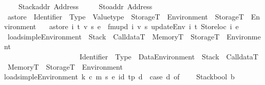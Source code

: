 \begin{isabellebody}
\ \ \ \ Stackaddr\ Address\ {\isacharbar}{\kern0pt}\isanewline
\ \ \ \ Stoaddr\ Address\isanewline
\isanewline
{}\isamarkupfalse%
\ astore\ {\isacharcolon}{\kern0pt}{\isacharcolon}{\kern0pt}\ {\isachardoublequoteopen}Identifier\ {\isasymRightarrow}\ Type\ {\isasymRightarrow}\ Valuetype\ {\isasymRightarrow}\ StorageT\ {\isacharasterisk}{\kern0pt}\ Environment\ {\isasymRightarrow}\ StorageT\ {\isacharasterisk}{\kern0pt}\ Environment{\isachardoublequoteclose}\isanewline
\ \ \ {\isachardoublequoteopen}astore\ i\ t\ v\ {\isacharparenleft}{\kern0pt}s{\isacharcomma}{\kern0pt}\ e{\isacharparenright}{\kern0pt}\ {\isacharequal}{\kern0pt}\ {\isacharparenleft}{\kern0pt}fmupd\ i\ v\ s{\isacharcomma}{\kern0pt}\ {\isacharparenleft}{\kern0pt}updateEnv\ i\ t\ {\isacharparenleft}{\kern0pt}Storeloc\ i{\isacharparenright}{\kern0pt}\ e{\isacharparenright}{\kern0pt}{\isacharparenright}{\kern0pt}{\isachardoublequoteclose}\isanewline
\isanewline
{}\isamarkupfalse%
\ loadsimple\isactrlsub E\isactrlsub n\isactrlsub v\isactrlsub i\isactrlsub r\isactrlsub o\isactrlsub n\isactrlsub m\isactrlsub e\isactrlsub n\isactrlsub t\ {\isacharcolon}{\kern0pt}{\isacharcolon}{\kern0pt}\ {\isachardoublequoteopen}{\isacharparenleft}{\kern0pt}Stack\ {\isasymtimes}\ CalldataT\ {\isasymtimes}\ MemoryT\ {\isasymtimes}\ StorageT\ {\isasymtimes}\ Environment{\isacharparenright}{\kern0pt}\ \isanewline
\ \ \ \ \ \ \ \ \ \ \ \ \ \ \ \ \ \ \ \ {\isasymRightarrow}\ {\isacharparenleft}{\kern0pt}Identifier\ {\isasymtimes}\ Type\ {\isasymtimes}\ Data\isactrlsub E\isactrlsub n\isactrlsub v\isactrlsub i\isactrlsub r\isactrlsub o\isactrlsub n\isactrlsub m\isactrlsub e\isactrlsub n\isactrlsub t{\isacharparenright}{\kern0pt}\ {\isasymRightarrow}\ {\isacharparenleft}{\kern0pt}Stack\ {\isasymtimes}\ CalldataT\ {\isasymtimes}\ MemoryT\ {\isasymtimes}\ StorageT\ {\isasymtimes}\ Environment{\isacharparenright}{\kern0pt}{\isachardoublequoteclose}\isanewline
\ \ \isanewline
{\isachardoublequoteopen}loadsimple\isactrlsub E\isactrlsub n\isactrlsub v\isactrlsub i\isactrlsub r\isactrlsub o\isactrlsub n\isactrlsub m\isactrlsub e\isactrlsub n\isactrlsub t\ {\isacharparenleft}{\kern0pt}k{\isacharcomma}{\kern0pt}\ c{\isacharcomma}{\kern0pt}\ m{\isacharcomma}{\kern0pt}\ s{\isacharcomma}{\kern0pt}\ e{\isacharparenright}{\kern0pt}\ {\isacharparenleft}{\kern0pt}id{\isacharprime}{\kern0pt}{\isacharcomma}{\kern0pt}\ tp{\isacharcomma}{\kern0pt}\ d{\isacharparenright}{\kern0pt}\ {\isacharequal}{\kern0pt}\ {\isacharparenleft}{\kern0pt}case\ d\ of\isanewline
\ \ \ \ Stackbool\ b\ {\isasymRightarrow}\isanewline

\end{isabellebody}
